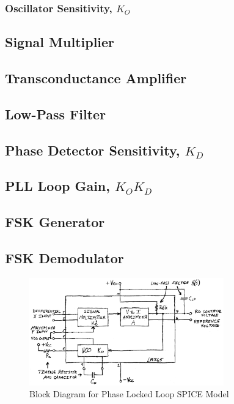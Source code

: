 \documentclass[titlepage, letterpaper, 10.5pt]{article}
\begin{document}
\subsubsection{Oscillator Sensitivity, $K_{O}$}

\subsection{Signal Multiplier}

\subsection{Transconductance Amplifier}

\subsection{Low-Pass Filter}

\subsection{Phase Detector Sensitivity, $K_{D}$}

\subsection{PLL Loop Gain, $K_{O}K_{D}$}

\subsection{FSK Generator}

\subsection{FSK Demodulator}

\begin{figure}[ht]
	\centering
	\includegraphics[width=0.75\textwidth]{diagrams/565-block-diagram-additional-c0-port}
	\caption{Block Diagram for Phase Locked Loop SPICE Model}
	\label{565-block-diagram-additional-c0-port}
\end{figure}
\end{document}
